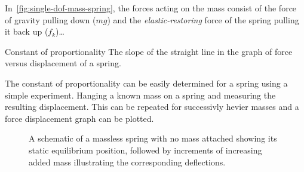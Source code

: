 \documentclass[a4paper, 12pt]{report}
\begin{document}
        In~\cref{fig:single-dof-mass-spring}, the forces acting on the mass consist of the force of gravity pulling down ($mg$) and the \textit{elastic-restoring} force of the spring pulling it back up ($f_k$)\dots

        \begin{fmd-definition}{Constant of proportionality}
          The slope of the straight line in the graph of force versus displacement of a spring.
        \end{fmd-definition}

        The constant of proportionality can be easily determined for a spring using a simple experiment. Hanging a known mass on a spring and measuring the resulting displacement. This can be repeated for successivly hevier masses and a force displacement graph can be plotted.

        \begin{figure}
          \caption{A schematic of a massless spring with no mass attached showing its static equilibrium position, followed by increments of increasing added mass illustrating the corresponding deflections.}\label{fig:spring-deflection} 
        \end{figure}
\end{document}
